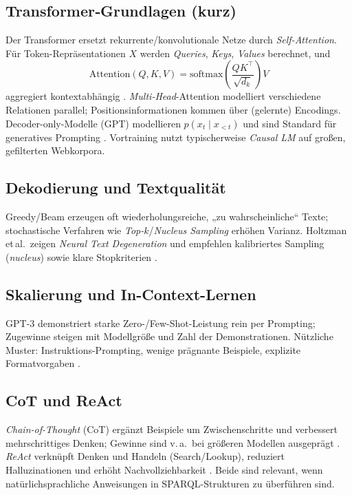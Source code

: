 \subsection{Transformer‐Grundlagen (kurz)}
Der Transformer ersetzt rekurrente/konvolutionale Netze durch \emph{Self-Attention}. Für Token-Repräsentationen $X$ werden \emph{Queries}, \emph{Keys}, \emph{Values} berechnet, und
\[
\mathrm{Attention}(Q,K,V)= \mathrm{softmax}\!\left(\frac{QK^\top}{\sqrt{d_k}}\right) V
\]
aggregiert kontextabhängig \cite{vaswani2017attention}. \emph{Multi-Head}-Attention modelliert verschiedene Relationen parallel; Positionsinformationen kommen über (gelernte) Encodings. Decoder-only-Modelle (GPT) modellieren $p(x_t\!\mid\!x_{<t})$ und sind Standard für generatives Prompting \cite{brown2020language}. Vortraining nutzt typischerweise \emph{Causal LM} auf großen, gefilterten Webkorpora.

\subsection{Dekodierung und Textqualität}
Greedy/Beam erzeugen oft wiederholungsreiche, „zu wahrscheinliche“ Texte; stochastische Verfahren wie \emph{Top-$k$}/\emph{Nucleus Sampling} erhöhen Varianz. Holtzman et\,al.\ zeigen \emph{Neural Text Degeneration} und empfehlen kalibriertes Sampling (\emph{nucleus}) sowie klare Stopkriterien \cite{holtzman2020curious}.

\subsection{Skalierung und In-Context-Lernen}
GPT-3 \cite{brown2020language} demonstriert starke Zero-/Few-Shot-Leistung rein per Prompting; Zugewinne steigen mit Modellgröße und Zahl der Demonstrationen. Nützliche Muster: Instruktions-Prompting, wenige prägnante Beispiele, explizite Formatvorgaben \cite{brown2020language,wei2022chain}.

\subsection{CoT und ReAct}
\emph{Chain-of-Thought} (CoT) ergänzt Beispiele um Zwischenschritte und verbessert mehrschrittiges Denken; Gewinne sind v.\,a.\ bei größeren Modellen ausgeprägt \cite{wei2022chain}. \emph{ReAct} verknüpft Denken und Handeln (Search/Lookup), reduziert Halluzinationen und erhöht Nachvollziehbarkeit \cite{yao2023react}. Beide sind relevant, wenn natürlichsprachliche Anweisungen in SPARQL-Strukturen zu überführen sind.

